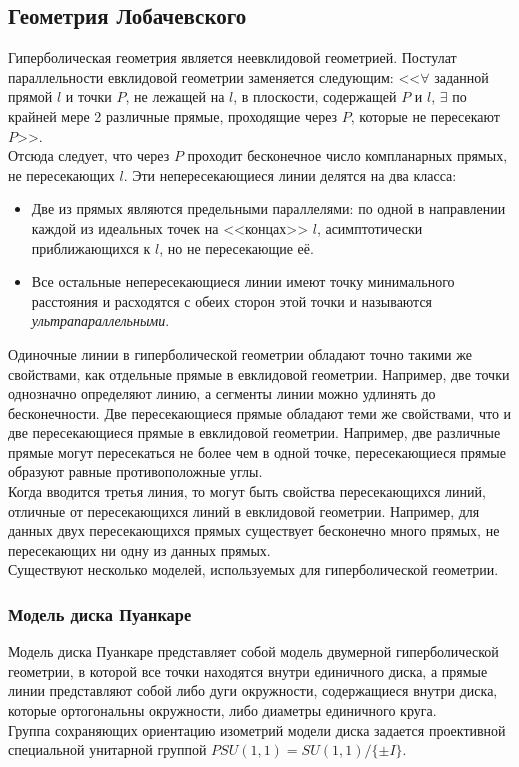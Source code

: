 \documentclass[12pt]{article}
\theoremstyle{definition}
\begin{document}
\subsection{Геометрия Лобачевского}
Гиперболическая геометрия является неевклидовой геометрией. Постулат параллельности евклидовой геометрии заменяется следующим: <<$\forall$ заданной прямой $l$ и точки $P$, не лежащей на $l$, в плоскости, содержащей $P$ и $l$, $\exists$ по крайней мере 2 различные прямые, проходящие через $P$, которые не пересекают $P$>>.\\
Отсюда следует, что через $P$ проходит бесконечное число компланарных прямых, не пересекающих $l$. Эти непересекающиеся линии делятся на два класса:
\begin{itemize}
    \item Две из прямых являются предельными параллелями: по одной в направлении каждой из идеальных точек на <<концах>> $l$, асимптотически приближающихся к $l$, но не пересекающие её.
    \item Все остальные непересекающиеся линии имеют точку минимального расстояния и расходятся с обеих сторон этой точки и называются \textit{ультрапараллельными}.
\end{itemize}
Одиночные линии в гиперболической геометрии обладают точно такими же свойствами, как отдельные прямые в евклидовой геометрии. Например, две точки однозначно определяют линию, а сегменты линии можно удлинять до бесконечности. Две пересекающиеся прямые обладают теми же свойствами, что и две пересекающиеся прямые в евклидовой геометрии. Например, две различные прямые могут пересекаться не более чем в одной точке, пересекающиеся прямые образуют равные противоположные углы.\\
Когда вводится третья линия, то могут быть свойства пересекающихся линий, отличные от пересекающихся линий в евклидовой геометрии. Например, для данных двух пересекающихся прямых существует бесконечно много прямых, не пересекающих ни одну из данных прямых.\\
Существуют несколько моделей, используемых для гиперболической геометрии.
\subsubsection{Модель диска Пуанкаре}
Модель диска Пуанкаре представляет собой модель двумерной гиперболической геометрии, в которой все точки находятся внутри единичного диска, а прямые линии представляют собой либо дуги окружности, содержащиеся внутри диска, которые ортогональны окружности, либо диаметры единичного круга.\\
Группа сохраняющих ориентацию изометрий модели диска задается проективной специальной унитарной группой $PSU(1,1)=SU(1,1)/\{\pm I\}$.
\end{document}
